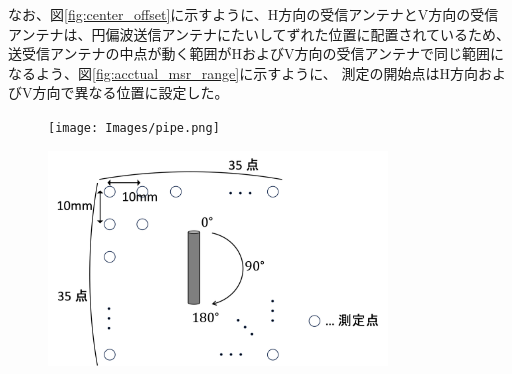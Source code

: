 \documentclass[11pt,a4paper,uplatex]{ujarticle}
\begin{document}
  なお、図\ref{fig:center_offset}に示すように、H方向の受信アンテナとV方向の受信アンテナは、円偏波送信アンテナにたいしてずれた位置に配置されているため、
  送受信アンテナの中点が動く範囲がHおよびV方向の受信アンテナで同じ範囲になるよう、図\ref{fig:acctual_msr_range}に示すように、
  測定の開始点はH方向およびV方向で異なる位置に設定した。


  \begin{figure}[tbp]
    \begin{minipage}{0.4\textwidth}
      \centering
      \texttt{[image: Images/pipe.png]}
      \label{fig:pipe}
    \end{minipage}
    \begin{minipage}{0.6\textwidth}
      \centering
      \includegraphics[keepaspectratio, width=90mm]{Images/msr_cond.png}
      \label{fig:msr_cond}
    \end{minipage}
  \end{figure}
\end{document}

